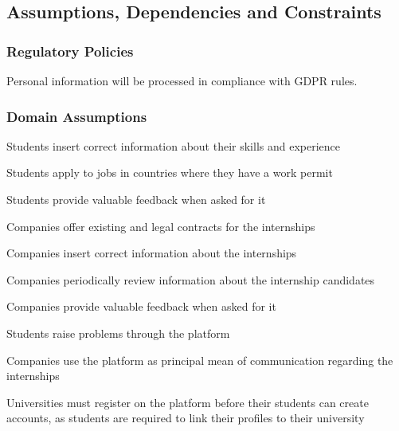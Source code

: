 \subsection{Assumptions, Dependencies and Constraints}
    \subsubsection{Regulatory Policies}
        Personal information will be processed in compliance with GDPR rules.
    
    \subsubsection{Domain Assumptions}
    \begin{enumerate}[label={[D\arabic*]}]
        \item {Students insert correct information about their skills and experience}
        \item {Students apply to jobs in countries where they have a work permit}
        \item {Students provide valuable feedback when asked for it}
        \item {Companies offer existing and legal contracts for the internships}
        \item {Companies insert correct information about the internships}
        \item {Companies periodically review information about the internship candidates}
        \item {Companies provide valuable feedback when asked for it}
        \item {Students raise problems through the platform}
        \item {Companies use the platform as principal mean of communication regarding the internships }
        \item {Universities must register on the platform before their students can create accounts, as students are required to link their profiles to their university}
    \end{enumerate}